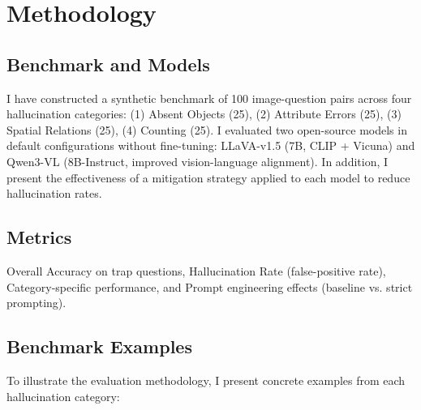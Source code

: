 \documentclass[11pt,a4paper]{article}
\begin{document}
\section{Methodology}

\subsection{Benchmark and Models}

I have constructed a synthetic benchmark of 100 image-question pairs across four hallucination categories: (1) Absent Objects (25), (2) Attribute Errors (25), (3) Spatial Relations (25), (4) Counting (25). I evaluated two open-source models in default configurations without fine-tuning: LLaVA-v1.5 (7B, CLIP + Vicuna) and Qwen3-VL (8B-Instruct, improved vision-language alignment). In addition, I present the effectiveness of a mitigation strategy applied to each model to reduce hallucination rates.

\subsection{Metrics}

Overall Accuracy on trap questions, Hallucination Rate (false-positive rate), Category-specific performance, and Prompt engineering effects (baseline vs. strict prompting).

\subsection{Benchmark Examples}

To illustrate the evaluation methodology, I present concrete examples from each hallucination category:
\end{document}

